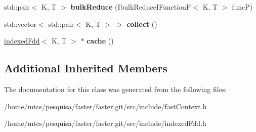 \begin{DoxyCompactItemize}
\item 
\hypertarget{classfaster_1_1indexedFdd_ac3086716ca3ee4490d76cfb23bce1f62}{}std\+::pair$<$ K, T $>$ {\bfseries bulk\+Reduce} (Ibulk\+Reduce\+I\+Function\+P$<$ K, T $>$ func\+P)\label{classfaster_1_1indexedFdd_ac3086716ca3ee4490d76cfb23bce1f62}

\item 
\hypertarget{classfaster_1_1indexedFdd_ae8222d15d17bb139bf07435227010607}{}std\+::vector$<$ std\+::pair$<$ K, T $>$ $>$ {\bfseries collect} ()\label{classfaster_1_1indexedFdd_ae8222d15d17bb139bf07435227010607}

\item 
\hypertarget{classfaster_1_1indexedFdd_adadcf78d4c0829655221ecdb29c952e2}{}\hyperlink{classfaster_1_1indexedFdd}{indexed\+Fdd}$<$ K, T $>$ $\ast$ {\bfseries cache} ()\label{classfaster_1_1indexedFdd_adadcf78d4c0829655221ecdb29c952e2}

\end{DoxyCompactItemize}
\subsection*{Additional Inherited Members}


The documentation for this class was generated from the following files\+:\begin{DoxyCompactItemize}
\item 
/home/mtcs/pesquisa/faster/faster.\+git/src/include/fast\+Context.\+h\item 
/home/mtcs/pesquisa/faster/faster.\+git/src/include/indexed\+Fdd.\+h\end{DoxyCompactItemize}
